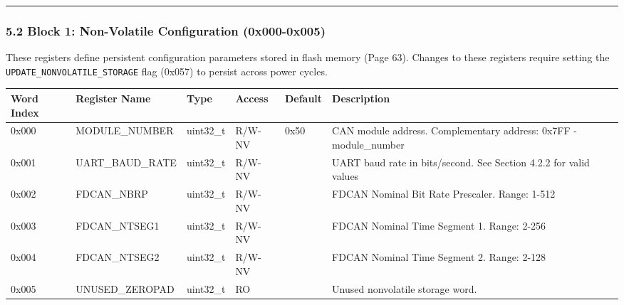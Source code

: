 \documentclass[
  11pt,
]{article}
\newcounter{none} %
\begin{document}
\begin{center}\rule{0.5\linewidth}{0.5pt}\end{center}

\subsubsection{5.2 Block 1: Non-Volatile Configuration
(0x000-0x005)}\label{block-1-non-volatile-configuration-0x000-0x005}

These registers define persistent configuration parameters stored in
flash memory (Page 63). Changes to these registers require setting the
\texttt{UPDATE\_NONVOLATILE\_STORAGE} flag (0x057) to persist across
power cycles.

{\def\LTcaptype{none} %
\begin{longtable}[]{@{}
  >{\raggedright\arraybackslash}p{}
  >{\raggedright\arraybackslash}p{}
  >{\raggedright\arraybackslash}p{}
  >{\raggedright\arraybackslash}p{}
  >{\raggedright\arraybackslash}p{}
  >{\raggedright\arraybackslash}p{}@{}}
\toprule\noalign{}
\begin{minipage}[b]{\linewidth}\raggedright
Word Index
\end{minipage} & \begin{minipage}[b]{\linewidth}\raggedright
Register Name
\end{minipage} & \begin{minipage}[b]{\linewidth}\raggedright
Type
\end{minipage} & \begin{minipage}[b]{\linewidth}\raggedright
Access
\end{minipage} & \begin{minipage}[b]{\linewidth}\raggedright
Default
\end{minipage} & \begin{minipage}[b]{\linewidth}\raggedright
Description
\end{minipage} \\
\midrule\noalign{}
\endhead
\bottomrule\noalign{}
\endlastfoot
0x000 & MODULE\_NUMBER & uint32\_t & R/W-NV & 0x50 & CAN module address.
Complementary address: 0x7FF - module\_number \\
0x001 & UART\_BAUD\_RATE & uint32\_t & R/W-NV & 460800 & UART baud rate
in bits/second. See Section 4.2.2 for valid values \\
0x002 & FDCAN\_NBRP & uint32\_t & R/W-NV & 2 & FDCAN Nominal Bit Rate
Prescaler. Range: 1-512 \\
0x003 & FDCAN\_NTSEG1 & uint32\_t & R/W-NV & 135 & FDCAN Nominal Time
Segment 1. Range: 2-256 \\
0x004 & FDCAN\_NTSEG2 & uint32\_t & R/W-NV & 34 & FDCAN Nominal Time
Segment 2. Range: 2-128 \\
0x005 & UNUSED\_ZEROPAD & uint32\_t & RO & 0 & Unused nonvolatile
storage word. \\
\end{longtable}
}
\end{document}
